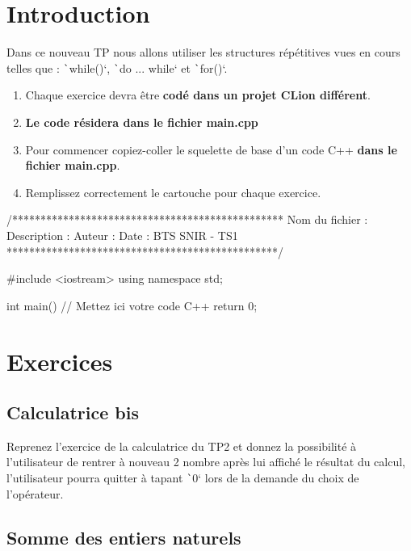 \documentclass[10pt]{article}
\begin{document}
\cartouche
\thispagestyle{firstpage}

\section{Introduction}
Dans ce nouveau TP nous allons utiliser les structures répétitives vues en cours telles que : \texttt`while()`,
\texttt`do ... while` et \texttt`for()`.

\begin{enumerate}
    \item Chaque exercice devra être \textbf{codé dans un projet CLion différent}.
    \item \textbf{Le code résidera dans le fichier main.cpp}
    \item Pour commencer copiez-coller le squelette de base d'un code C++ \textbf{dans le fichier main.cpp}.
    \item Remplissez correctement le cartouche pour chaque exercice.
\end{enumerate}

\begin{cppcode}
    /************************************************
    Nom du fichier : 
    Description : 
    Auteur :
    Date :
    BTS SNIR - TS1
    ************************************************/

    #include <iostream>
    using namespace std;

    int main() {
        // Mettez ici votre code C++
        return 0;
    }
\end{cppcode}


\section{Exercices}


\subsection{Calculatrice bis}
Reprenez l'exercice de la calculatrice du TP2 et donnez la possibilité à l'utilisateur de rentrer à nouveau 2 nombre après lui affiché le résultat du calcul, l'utilisateur pourra quitter à tapant \texttt`0` lors de la demande du choix de l'opérateur. 

\subsection{Somme des entiers naturels}
\end{document}
